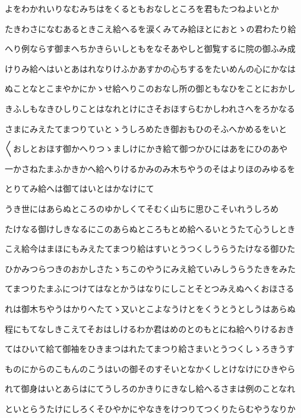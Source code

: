 \documentclass[a4paper,11pt,landscape]{ltjtarticle}
\begin{document}
\par\medskip
よをわかれいりなむみちはをくるともおなしところを君もたつねよいとか
\par\medskip
たきわさになむあるときこえ給へるを涙くみてみ給ほとにおとゝの君わたり給
\par\medskip
へり例ならす御まへちかきらいしともをなそあやしと御覧するに院の御ふみ成
\par\medskip
けりみ給へはいとあはれなりけふかあすかの心ちするをたいめんの心にかなは
\par\medskip
ぬことなとこまやかにかゝせ給へりこのおなし所の御ともなひをことにおかし
\par\medskip
きふしもなきひしりことはなれとけにさそおほすらむかしわれさへをろかなる
\par\medskip
さまにみえたてまつりていとゝうしろめたき御おもひのそふへかめるをいと
\par\medskip
〱おしとおほす御かへりつゝましけにかき給て御つかひにはあをにひのあや
\par\medskip
一かさねたまふかきかへ給へりけるかみのみ木ちやうのそはよりほのみゆるを
\par\medskip
とりてみ給へは御てはいとはかなけにて
\par\medskip
うき世にはあらぬところのゆかしくてそむく山ちに思ひこそいれうしろめ
\par\medskip
たけなる御けしきなるにこのあらぬところもとめ給へるいとうたて心うしとき
\par\medskip
こえ給今はまほにもみえたてまつり給はすいとうつくしうらうたけなる御ひた
\par\medskip
ひかみつらつきのおかしさたゝちこのやうにみえ給ていみしうらうたきをみた
\par\medskip
てまつりたまふにつけてはなとかうはなりにしことそとつみえぬへくおほさる
\par\medskip
れは御木ちやうはかりへたてゝ又いとこよなうけとをくうとうとしうはあらぬ
\par\medskip
程にもてなしきこえてそおはしけるわか君はめのとのもとにね給へりけるおき
\par\medskip
てはひいて給て御袖をひきまつはれたてまつり給さまいとうつくしゝろきうす
\par\medskip
ものにからのこもんのこうはいの御そのすそいとなかくしとけなけにひきやら
\par\medskip
れて御身はいとあらはにてうしろのかきりにきなし給へるさまは例のことなれ
\par\medskip
といとらうたけにしろくそひやかにやなきをけつりてつくりたらむやうなりか
\par\medskip
\end{document}

